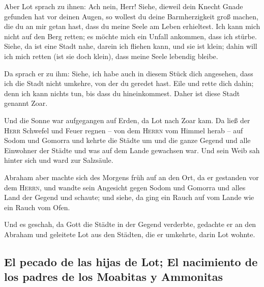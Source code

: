  Aber Lot sprach zu ihnen: Ach nein, Herr!
 Siehe, dieweil dein Knecht Gnade gefunden hat vor deinen
Augen, so wollest du deine Barmherzigkeit groß machen, die du an mir
getan hast, dass du meine Seele am Leben erhieltest. Ich kann mich nicht
auf den Berg retten; es möchte mich ein Unfall ankommen, dass ich
stürbe.  Siehe, da ist eine Stadt nahe, darein ich
fliehen kann, und sie ist klein; dahin will ich mich retten (ist sie
doch klein), dass meine Seele lebendig bleibe.

 Da sprach er zu ihm: Siehe, ich habe auch in diesem
Stück dich angesehen, dass ich die Stadt nicht umkehre, von der du
geredet hast.  Eile und rette dich dahin; denn ich kann
nichts tun, bis dass du hineinkommest. Daher ist diese Stadt genannt
Zoar.

 Und die Sonne war aufgegangen auf Erden, da Lot nach
Zoar kam.  Da ließ der \textsc{Herr} Schwefel und Feuer
regnen -- von dem \textsc{Herrn} vom Himmel herab -- auf Sodom und
Gomorra  und kehrte die Städte um und die ganze Gegend
und alle Einwohner der Städte und was auf dem Lande gewachsen war.
 Und sein Weib sah hinter sich und ward zur Salzsäule.

 Abraham aber machte sich des Morgens früh auf an den
Ort, da er gestanden vor dem \textsc{Herrn},  und wandte
sein Angesicht gegen Sodom und Gomorra und alles Land der Gegend und
schaute; und siehe, da ging ein Rauch auf vom Lande wie ein Rauch vom
Ofen.

 Und es geschah, da Gott die Städte in der Gegend
verderbte, gedachte er an den Abraham und geleitete Lot aus den Städten,
die er umkehrte, darin Lot wohnte.

\hypertarget{el-pecado-de-las-hijas-de-lot-el-nacimiento-de-los-padres-de-los-moabitas-y-ammonitas}{%
\subsection{El pecado de las hijas de Lot; El nacimiento de los padres
de los Moabitas y
Ammonitas}\label{el-pecado-de-las-hijas-de-lot-el-nacimiento-de-los-padres-de-los-moabitas-y-ammonitas}}

